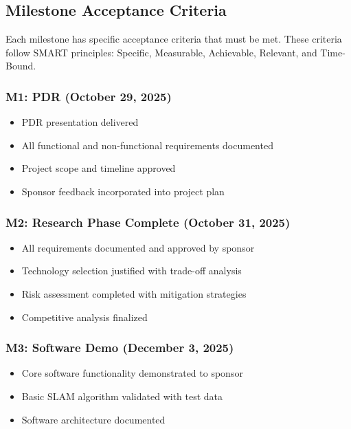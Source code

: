 \subsection{Milestone Acceptance Criteria}

Each milestone has specific acceptance criteria that must be met. These criteria follow SMART principles: Specific, Measurable, Achievable, Relevant, and Time-Bound.

\subsubsection{M1: PDR (October 29, 2025)}

\begin{itemize}
    \item PDR presentation delivered
    \item All functional and non-functional requirements documented
    \item Project scope and timeline approved
    \item Sponsor feedback incorporated into project plan
\end{itemize}

\subsubsection{M2: Research Phase Complete (October 31, 2025)}

\begin{itemize}
    \item All requirements documented and approved by sponsor
    \item Technology selection justified with trade-off analysis
    \item Risk assessment completed with mitigation strategies
    \item Competitive analysis finalized
\end{itemize}

\subsubsection{M3: Software Demo (December 3, 2025)}

\begin{itemize}
    \item Core software functionality demonstrated to sponsor
    \item Basic SLAM algorithm validated with test data
    \item Software architecture documented
\end{itemize}

